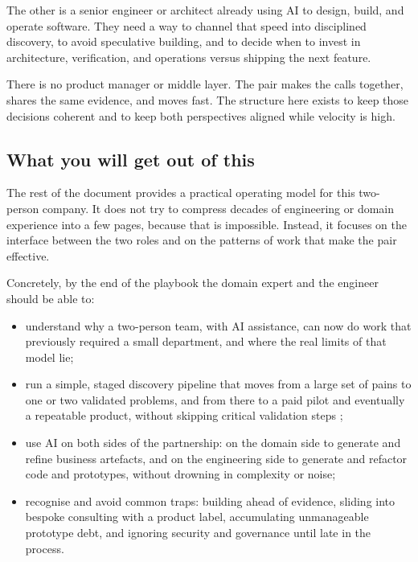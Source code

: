 \documentclass[10pt, a4paper, twocolumn]{article} %
\begin{document}
The other is a senior engineer or architect already using AI to design, build, and operate software. They need a way to channel that speed into disciplined discovery, to avoid speculative building, and to decide when to invest in architecture, verification, and operations versus shipping the next feature.

There is no product manager or middle layer. The pair makes the calls together, shares the same evidence, and moves fast. The structure here exists to keep those decisions coherent and to keep both perspectives aligned while velocity is high.

\newpage

\subsection{What you will get out of this}

The rest of the document provides a practical operating model for this two-person company. It does not try to compress decades of engineering or domain experience into a few pages, because that is impossible. Instead, it focuses on the interface between the two roles and on the patterns of work that make the pair effective.

Concretely, by the end of the playbook the domain expert and the engineer should be able to:

\begin{itemize}
  \item understand why a two-person team, with AI assistance, can now do work that previously required a small department, and where the real limits of that model lie;
  \item run a simple, staged discovery pipeline that moves from a large set of pains to one or two validated problems, and from there to a paid pilot and eventually a repeatable product, without skipping critical validation steps \citep{ries2011lean,bland2019testing};
  \item use AI on both sides of the partnership: on the domain side to generate and refine business artefacts, and on the engineering side to generate and refactor code and prototypes, without drowning in complexity or noise;
  \item recognise and avoid common traps: building ahead of evidence, sliding into bespoke consulting with a product label, accumulating unmanageable prototype debt, and ignoring security and governance until late in the process.
\end{itemize}
\end{document}
